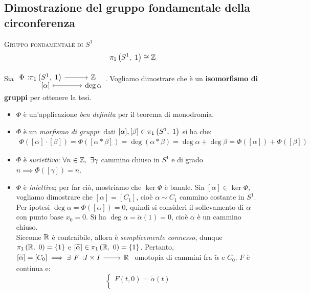 \subsection{Dimostrazione del gruppo fondamentale della circonferenza}
\begin{theorema}\textsc{Gruppo fondamentale di $S^1$}\\
	\begin{equation}
		\gruf{S^1}{1}\cong\integerset
	\end{equation}
\vspace{-6mm}
\end{theorema}
\begin{demonstration}
	Sia $\displaystyle \funztot \Phi {\gruf{S^1}{1}} \integerset {\left[\alpha\right]} {\deg\alpha}$. Vogliamo dimostrare che è un \textbf{isomorfismo di gruppi} per ottenere la tesi.
		\begin{itemize}
			\item $\Phi$ è un'applicazione \textit{ben definita} per il teorema di monodromia.
			\item $\Phi$ è un \textit{morfismo di gruppi}: dati $[\alpha],[\beta]\in\gruf{S^1}{1}$ si ha che:
				\begin{gather*}
					\Phi([\alpha]\cdot [\beta])=\Phi([\alpha\ast\beta])=\deg(\alpha\ast\beta)=\deg\alpha+\deg\beta=\Phi([\alpha])+\Phi([\beta])
				\end{gather*}
			\item $\Phi$ è \textit{suriettiva}: $\forall n\in\mathbb{Z},\ \exists \gamma$ cammino chiuso in $S^1$ e di grado $n\implies \Phi([\gamma])=n$.
			\item $\Phi$ è \textit{iniettiva}; per far ciò, mostriamo che $\ker\Phi$ è banale. Sia $[\alpha]\in\ker\Phi$, vogliamo dimostrare che $[\alpha]=[C_1]$, cioè $\alpha\sim C_1$ cammino costante in $S^1$. Per ipotesi $\deg\alpha=\Phi([\alpha])=0$, quindi si consideri il sollevamento di $\alpha$ con punto base $x_0=0$. Si ha $\deg\alpha=\widetilde{\alpha}(1)=0$, cioè $\alpha$ è un cammino chiuso. \\
			Siccome $\mathbb{R}$ è contraibile, allora è \textit{semplicemente connesso}, dunque $\gruf{\realset}{0}=\left\{1\right\}$ e $[\widetilde{\alpha}]\in\gruf{\realset}{0}=\left\{1\right\}$.
			Pertanto, $[\widetilde{\alpha}]=[C_0]\implies \exists \funz F {I\times I}  \realset$ omotopia di cammini fra $\widetilde{\alpha}$ e $C_0$. $F$ è continua e:
			\begin{equation*}
				\begin{cases}
					F(t,0)=\widetilde{\alpha}(t)\\

\end{cases}
\end{equation*}
\end{itemize}
\end{demonstration}
